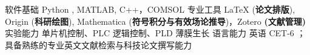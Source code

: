\vspace{2.0mm}


\begin{cvskills}
  \cvskill
    {软件基础} %
    {Python , MATLAB, C++，COMSOL} %
  \cvskill
    {专业工具}
    {LaTeX (\textbf{论文排版}), Origin (\textbf{科研绘图}), Mathematica (\textbf{符号积分与有效场论推导})，Zotero \textbf{(文献管理)}}
 \cvskill
    {实验能力}
    {单片机控制、PLC 逻辑控制、PLD 薄膜生长}   
 \cvskill
    {语言能力}
    {英语 CET-6  ； 具备熟练的专业英文文献检索与科技论文撰写能力 }
\end{cvskills}
